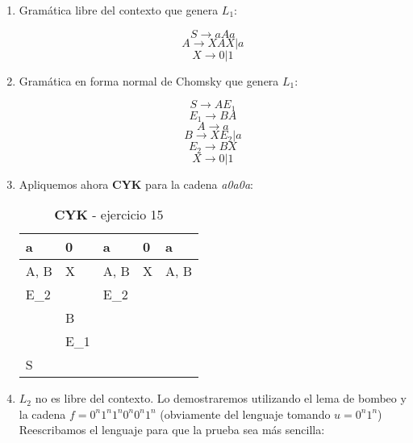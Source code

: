 \documentclass[11pt,a4paper]{article}
\begin{document}
\begin{enumerate}
	\item Gramática libre del contexto que genera $L_1$:
		
	$$ S \rightarrow aAa $$
	$$ A \rightarrow XAX | a $$
	$$ X \rightarrow 0|1 $$
		
	\item Gramática en forma normal de Chomsky que genera $L_1$:
	
	$$ S \rightarrow AE_1 $$
	$$ E_1 \rightarrow BA $$
	$$ A \rightarrow a $$
	$$ B \rightarrow XE_2 | a $$
	$$ E_2 \rightarrow BX $$
	$$ X \rightarrow 0|1 $$
	
	\item Apliquemos ahora \textbf{CYK} para la cadena \emph{a0a0a}:
	
	\begin{table}[h]
		\centering
		\caption{\textbf{CYK} - ejercicio 15}
		\label{my-label}
		\begin{tabular}{lllll}
			a                          & 0                         & a                         & 0                      & a                         \\ \hline
			\multicolumn{1}{|l|}{A, B} & \multicolumn{1}{l|}{X}    & \multicolumn{1}{l|}{A, B} & \multicolumn{1}{l|}{X} & \multicolumn{1}{l|}{A, B} \\ \hline
			\multicolumn{1}{|l|}{E\_2} & \multicolumn{1}{l|}{}     & \multicolumn{1}{l|}{E\_2} & \multicolumn{1}{l|}{}  &                           \\ \cline{1-4}
			\multicolumn{1}{|l|}{}     & \multicolumn{1}{l|}{B}    & \multicolumn{1}{l|}{}     &                        &                           \\ \cline{1-3}
			\multicolumn{1}{|l|}{}     & \multicolumn{1}{l|}{E\_1} &                           &                        &                           \\ \cline{1-2}
			\multicolumn{1}{|l|}{S}    &                           &                           &                        &                           \\ \cline{1-1}
		\end{tabular}
	\end{table}
	
	\item $L_2$ no es libre del contexto. Lo demostraremos utilizando el lema de bombeo y la cadena $f = 0^n1^n1^n0^n0^n1^n$ (obviamente del lenguaje tomando $u = 0^n1^n$) Reescribamos el lenguaje para que la prueba sea más sencilla:
	

\end{enumerate}
\end{document}
